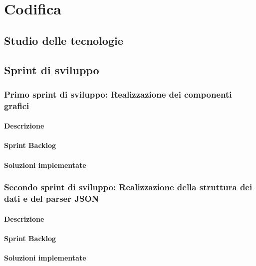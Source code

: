 
\chapter{Codifica}
\label{cap:codifica}

\section{Studio delle tecnologie}

\section{Sprint di sviluppo}

\subsection{Primo sprint di sviluppo: Realizzazione dei componenti grafici}
\subsubsection*{Descrizione}
\subsubsection*{Sprint Backlog}
\subsubsection*{Soluzioni implementate}

\subsection{Secondo sprint di sviluppo: Realizzazione della struttura dei dati e del parser JSON}
\subsubsection*{Descrizione}
\subsubsection*{Sprint Backlog}
\subsubsection*{Soluzioni implementate}

